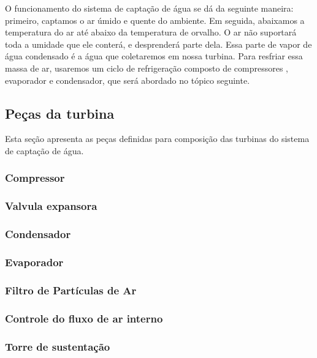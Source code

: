       O funcionamento do sistema de captação de água se dá da seguinte maneira: primeiro, captamos o ar úmido e quente do ambiente.
      Em seguida, abaixamos a temperatura do ar até abaixo da temperatura de orvalho. O ar não suportará toda a umidade que ele
      conterá, e desprenderá parte dela. Essa parte de vapor de água condensado é a água que coletaremos em nossa turbina. 
      Para resfriar essa massa de ar, usaremos um ciclo de refrigeração composto de compressores , evaporador e condensador,
      que será abordado no tópico seguinte.
    
    \subsection{Peças da turbina}
      
      Esta seção apresenta as peças definidas para composição das turbinas do sistema de captação de água.
      
    	\subsubsection{Compressor}
		
	\subsubsection{Valvula expansora}
		
	\subsubsection{Condensador}
		
	\subsubsection{Evaporador}
		
	\subsubsection{Filtro de Partículas de Ar}
		
	\subsubsection{Controle do fluxo de ar interno}
		
	\subsubsection{Torre de sustentação}
		
